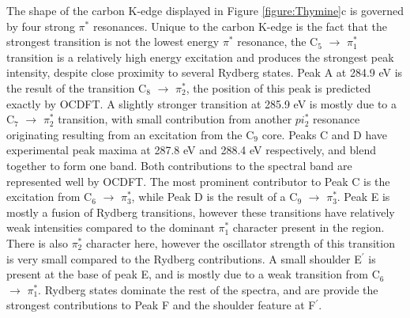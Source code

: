 \documentclass[11.5pt]{article}
\begin{document}
   The shape of the carbon K-edge displayed in Figure \ref{figure:Thymine}c is governed by four strong $\pi^*$ resonances. Unique to the carbon K-edge is the fact that the strongest transition is not the lowest energy $\pi^*$ resonance, the C$_5$ $\rightarrow$ $\pi_1^*$ transition is a relatively high energy excitation and produces the strongest peak intensity, despite close proximity to several Rydberg states. Peak A at 284.9 eV is the result of the transition C$_8$ $\rightarrow$ $\pi_2^*$, the position of this peak is predicted exactly by OCDFT. A slightly stronger transition at 285.9 eV is mostly due to a  C$_7$ $\rightarrow$ $\pi_2^*$ transition, with small contribution from another $pi_2^*$ resonance originating resulting from an excitation from the C$_9$ core. Peaks C and D have experimental peak maxima at 287.8 eV and 288.4 eV respectively, and blend together to form one band. Both contributions to the spectral band are represented well by OCDFT. The most prominent contributor to Peak C is the excitation from C$_6$ $\rightarrow$ $\pi^*_3$, while Peak D is the result of a C$_9$ $\rightarrow$ $\pi^*_3$. Peak E is mostly a fusion of Rydberg transitions, however these transitions have relatively weak intensities compared to the dominant $\pi_1^*$ character present in the region. There is also $\pi^*_2$ character here, however the oscillator strength of this transition is very small compared to the Rydberg contributions. A small shoulder E$^{\prime}$ is present at the base of peak E, and is mostly due to a weak transition from C$_6$ $\rightarrow$ $\pi_1^*$.  Rydberg states dominate the rest of the spectra, and are provide the strongest contributions to Peak F and the shoulder feature at F$^{\prime}$.
\\ \\
\end{document}
